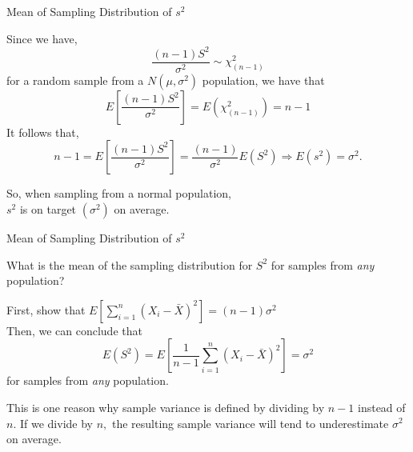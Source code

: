 \documentclass{beamer}\usepackage[]{graphicx}\usepackage[]{color}
\begin{document}
\begin{frame}{Mean of Sampling Distribution of $s^2$}

Since we have,
$$\frac{(n-1)S^2}{\sigma^2}\sim\chi^2_{(n-1)}$$ for a random sample from a
$N(\mu,\sigma^2)$ population, we have that
$$E\left[\frac{(n-1)S^2}{\sigma^2}\right] 
= E(\chi^2_{(n-1)}) = n-1$$ \pause
It follows that, $$n-1 = E\left[\frac{(n-1)S^2}{\sigma^2}\right]
          = \frac{(n-1)}{\sigma^2}E(S^2) \Rightarrow
E(s^2)=\sigma^2.$$

So, when sampling from a normal population, \\
$s^2$ is on target $(\sigma^2)$ on average.
\bigskip



\end{frame}

\begin{frame}{Mean of Sampling Distribution of $s^2$}

What is the mean of the sampling distribution for $S^2$ for 
samples from {\em any} population? \pause
\bigskip

First, show that $\displaystyle E \left[\sum_{i=1}^n
(X_i-\bar{X})^2\right] = (n-1)\sigma^2$\\ \pause
\bigskip
Then, we can conclude that 
$$E(S^2) = E\left[\frac{1}{n-1}\sum_{i=1}^n (X_i-\bar{X})^2\right]
= \sigma^2$$
for samples from {\em any} population. \pause
\bigskip

This is one reason why sample variance is defined by dividing by $n-1$
instead of $n.$  If we divide by $n,$ the resulting sample variance will
tend to underestimate $\sigma^2$ on average. \pause

\end{frame}
\end{document}

